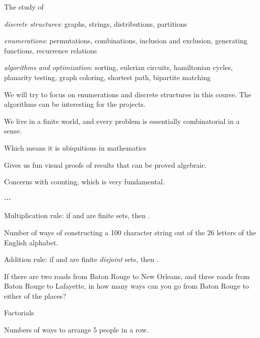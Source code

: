 \startchapter [title={Combinatorics basics}]
	
	\startsection [title={What is combinatorics?}]
		The study of
		\startitemize [r, joinedup]
			\item  \emph{discrete structures}: graphs, strings, distributions, partitions
			\item  \emph{enumerations}: permutations, combinations, inclusion and exclusion, generating functions, recurrence relations
			\item  \emph{algorithms and optimization}: sorting, eulerian circuits, hamiltonian cycles, planarity testing, graph coloring, shortest path, bipartite matching
		\stopitemize

		We will try to focus on enumerations and discrete structures in this course. The algorithms can be interesting for the projects.

		\startsubject [title={Why is it interesting?}]
			\startitemize [1, joinedup]
				\item  We live in a finite world, and every problem is essentially combinatorial in a sense.
				\item  Which means it is ubiquitious in mathematics
				\item  Gives us fun visual proofs of results that can be proved algebraic.
				\item  Concerns with counting, which is very fundamental.
				\item  ⋯
			\stopitemize
		\stopsubject
	\stopsection

	\startsection [title={Enumerations}]
				
		\startitemize [1, joinedup]
		
			\item  Multiplication rule: if  and  are finite sets, then .

				Number of ways of constructing a 100 character string out of the 26 letters of the English alphabet.

			\item  Addition rule: if  and  are finite \emph{disjoint} sets, then .

				If there are two roads from Baton Rouge to New Orleans, and three roads from Baton Rouge to Lafayette, in how many ways can you go from Baton Rouge to either of the places?

			\item  Factorials

				Numbers of ways to arrange 5 people in a row.
			
